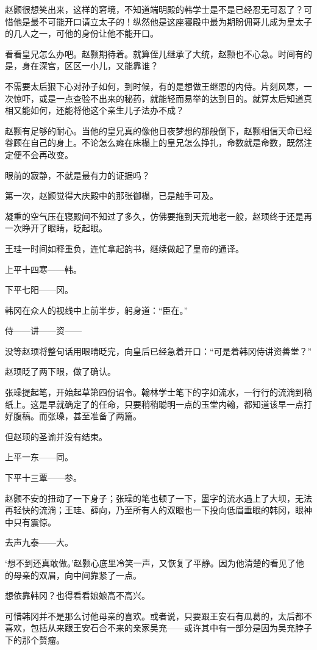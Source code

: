 赵颢很想笑出来，这样的窘境，不知道端明殿的韩学士是不是已经忍无可忍了？可惜他是最不可能开口请立太子的！纵然他是这座寝殿中最为期盼佣哥儿成为皇太子的几人之一，可他的身份让他不能开口。

看看皇兄怎么办吧。赵颢期待着。就算侄儿继承了大统，赵颢也不心急。时间有的是，身在深宫，区区一小儿，又能靠谁？

不需要太后狠下心对孙子如何，到时候，有的是想做王继恩的内侍。片刻风寒，一次惊吓，或是一点查验不出来的秘药，就能轻而易举的达到目的。就算太后知道真相又能如何，还能将他这个亲生儿子法办不成？

赵颢有足够的耐心。当他的皇兄真的像他日夜梦想的那般倒下，赵颢相信天命已经眷顾在自己的身上。不论怎么瘫在床榻上的皇兄怎么挣扎，命数就是命数，既然注定便不会再改变。

眼前的寂静，不就是最有力的证据吗？

第一次，赵颢觉得大庆殿中的那张御榻，已是触手可及。

凝重的空气压在寝殿间不知过了多久，仿佛要拖到天荒地老一般，赵顼终于还是再一次睁开了眼睛，眨起眼。

王珪一时间如释重负，连忙拿起韵书，继续做起了皇帝的通译。

上平十四寒——韩。

下平七阳——冈。

韩冈在众人的视线中上前半步，躬身道：“臣在。”

侍——讲——资——

没等赵顼将整句话用眼睛眨完，向皇后已经急着开口：“可是着韩冈侍讲资善堂？”

赵顼眨了两下眼，做了确认。

张璪提起笔，开始起草第四份诏令。翰林学士笔下的字如流水，一行行的流淌到稿纸上。这是早就确定了的任命，只要稍稍聪明一点的玉堂内翰，都知道该早一点打好腹稿。而张璪，甚至准备了两篇。

但赵顼的圣谕并没有结束。

上平一东——同。

下平十三覃——参。

赵颢不安的扭动了一下身子；张璪的笔也顿了一下，墨字的流水遇上了大坝，无法再轻快的流淌；王珪、薛向，乃至所有人的双眼也一下投向低眉垂眼的韩冈，眼神中只有震惊。

去声九泰——大。

‘想不到还真敢做。’赵颢心底里冷笑一声，又恢复了平静。因为他清楚的看见了他的母亲的双眉，向中间靠紧了一点。

想依靠韩冈？也得看看娘娘高不高兴。

可惜韩冈并不是那么讨他母亲的喜欢。或者说，只要跟王安石有瓜葛的，太后都不喜欢，包括从来跟王安石合不来的亲家吴充——或许其中有一部分是因为吴充脖子下的那个赘瘤。

